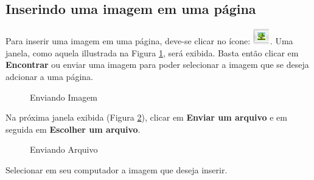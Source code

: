 \subsection{Inserindo uma imagem em uma página}

Para inserir uma imagem em uma página, deve-se clicar no ícone: \includegraphics{imagem/cap4/fig12.jpg}. Uma janela, como aquela illustrada na Figura \ref{fig:cap4_13}, será exibida. Basta então clicar em \textbf{Encontrar} ou enviar uma imagem para poder selecionar a imagem que se deseja
adcionar a uma página.

\begin{figure}[htbp]
 \begin{center}
  \caption{Enviando Imagem}
  \label{fig:cap4_13}
 \end{center}
\end{figure}

Na próxima janela exibida (Figura \ref{fig:cap4_14}), clicar em \textbf{Enviar um arquivo} e em seguida em \textbf{Escolher um arquivo}.
\begin{figure}[htbp]
 \begin{center}
  \caption{Enviando Arquivo}
  \label{fig:cap4_14}
 \end{center}
\end{figure}
Selecionar em seu computador a imagem que deseja inserir.

